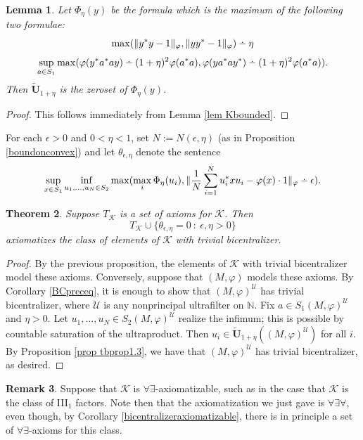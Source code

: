 \documentclass[12pt]{amsart}
\makeatletter
\newtheorem{thm}{Theorem}[section]
\newtheorem{lem}[thm]{Lemma}
\theoremstyle{definition}
\newtheorem{remark}[thm]{Remark}
\def\bb{\mathbb}
\def\bb{\mathbb}
\def\cal{\mathcal}
\def\u{\mathsf 1}
\def\dotminussym#1#2{%
  \setbox0=\hbox{$\m@th#1-$}%
  \kern.5\wd0%
  \hbox to 0pt{\hss\hbox{$\m@th#1-$}\hss}%
  \raise.6\ht0\hbox to 0pt{\hss$\m@th#1.$\hss}%
  \kern.5\wd0}
\newcommand{\dotminus}{\mathbin{\mathpalette\dotminussym{}}}
\def \u{\mathcal U}
\makeatother
\begin{document}
\begin{lem}
Let $\Phi_\eta(y)$ be the formula which is the maximum of the following two formulae:
$$\max(\|y^*y-1\|_\varphi,\|yy^*-1\|_\varphi)\dotminus \eta$$ $$\sup_{a\in S_1}\max(\varphi(y^*a^*ay)\dotminus (1+\eta)^2\varphi(a^*a),\varphi(ya^*ay^*)\dotminus (1+\eta)^2\varphi(a^*a)).$$
Then $\tilde{\mathbf{U}}_{1+\eta}$ is the zeroset of $\Phi_{\eta}(y)$.
\end{lem}

\begin{proof}
This follows immediately from Lemma \ref{lem Kbounded}.
\end{proof}

For each $\epsilon>0$ and $0<\eta<1$, set $N:=N(\epsilon,\eta)$ (as in Proposition \ref{boundonconvex}) and let $\theta_{\epsilon,\eta}$ denote the sentence
$$\sup_{x\in S_1} \inf_{u_1,\ldots,u_N\in S_2}\max(\max_i \Phi_\eta(u_i),\|\frac{1}{N}\sum_{i=1}^N u_i^*xu_i-\varphi(x)\cdot 1\|_\varphi\dotminus \epsilon).$$

\begin{thm}\label{thm trivialBCaxiomatizable}
Suppose $T_{\cal K}$ is a set of axioms for $\cal K$.  Then 
$$T_{\cal K}\cup\{\theta_{\epsilon,\eta}=0 \ : \ \epsilon,\eta>0\}$$
axiomatizes the class of elements of $\cal K$ with trivial bicentralizer.
\end{thm}

\begin{proof}
By the previous proposition, the elements of $\cal K$ with trivial bicentralizer model these axioms.  Conversely, suppose that $(M,\varphi)$ models these axioms.  By Corollary \ref{BCpreceq}, it is enough to show that $(M,\varphi)^\u$ has trivial bicentralizer, where $\u$ is any nonprincipal ultrafilter on $\bb N$.  Fix $a\in S_1(M,\varphi)^\u$ and $\eta>0$.  Let $u_1,\ldots,u_N\in S_2(M,\varphi)^\u$ realize the infimum; this is possible by countable saturation of the ultraproduct.  Then $u_i\in \tilde{\mathbf{U}}_{1+\eta}((M,\varphi)^\u)$ for all $i$.  By Proposition \ref{prop tbprop1.3}, we have that $(M,\varphi)^\u$ has trivial bicentralizer, as desired.
\end{proof}

\begin{remark}
Suppose that $\cal K$ is $\forall\exists$-axiomatizable, such as in the case that $\cal K$ is the class of III$_1$ factors.  Note then that the axiomatization we just gave is $\forall\exists\forall$, even though, by Corollary \ref{bicentralizeraxiomatizable}, there is in principle a set of $\forall\exists$-axioms for this class.
\end{remark}
\end{document}
